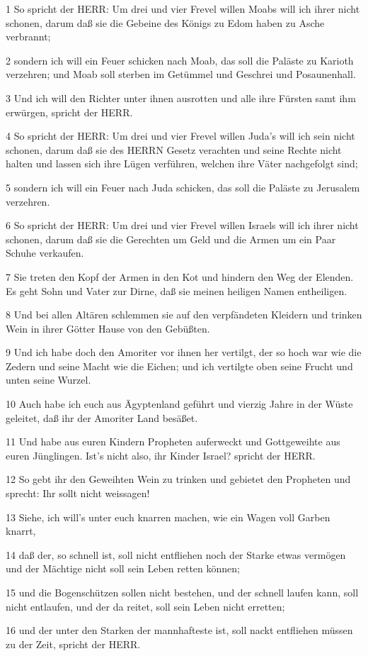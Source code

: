 \par 1 So spricht der HERR: Um drei und vier Frevel willen Moabs will ich ihrer nicht schonen, darum daß sie die Gebeine des Königs zu Edom haben zu Asche verbrannt;
\par 2 sondern ich will ein Feuer schicken nach Moab, das soll die Paläste zu Karioth verzehren; und Moab soll sterben im Getümmel und Geschrei und Posaunenhall.
\par 3 Und ich will den Richter unter ihnen ausrotten und alle ihre Fürsten samt ihm erwürgen, spricht der HERR.
\par 4 So spricht der HERR: Um drei und vier Frevel willen Juda's will ich sein nicht schonen, darum daß sie des HERRN Gesetz verachten und seine Rechte nicht halten und lassen sich ihre Lügen verführen, welchen ihre Väter nachgefolgt sind;
\par 5 sondern ich will ein Feuer nach Juda schicken, das soll die Paläste zu Jerusalem verzehren.
\par 6 So spricht der HERR: Um drei und vier Frevel willen Israels will ich ihrer nicht schonen, darum daß sie die Gerechten um Geld und die Armen um ein Paar Schuhe verkaufen.
\par 7 Sie treten den Kopf der Armen in den Kot und hindern den Weg der Elenden. Es geht Sohn und Vater zur Dirne, daß sie meinen heiligen Namen entheiligen.
\par 8 Und bei allen Altären schlemmen sie auf den verpfändeten Kleidern und trinken Wein in ihrer Götter Hause von den Gebüßten.
\par 9 Und ich habe doch den Amoriter vor ihnen her vertilgt, der so hoch war wie die Zedern und seine Macht wie die Eichen; und ich vertilgte oben seine Frucht und unten seine Wurzel.
\par 10 Auch habe ich euch aus Ägyptenland geführt und vierzig Jahre in der Wüste geleitet, daß ihr der Amoriter Land besäßet.
\par 11 Und habe aus euren Kindern Propheten auferweckt und Gottgeweihte aus euren Jünglingen. Ist's nicht also, ihr Kinder Israel? spricht der HERR.
\par 12 So gebt ihr den Geweihten Wein zu trinken und gebietet den Propheten und sprecht: Ihr sollt nicht weissagen!
\par 13 Siehe, ich will's unter euch knarren machen, wie ein Wagen voll Garben knarrt,
\par 14 daß der, so schnell ist, soll nicht entfliehen noch der Starke etwas vermögen und der Mächtige nicht soll sein Leben retten können;
\par 15 und die Bogenschützen sollen nicht bestehen, und der schnell laufen kann, soll nicht entlaufen, und der da reitet, soll sein Leben nicht erretten;
\par 16 und der unter den Starken der mannhafteste ist, soll nackt entfliehen müssen zu der Zeit, spricht der HERR.

